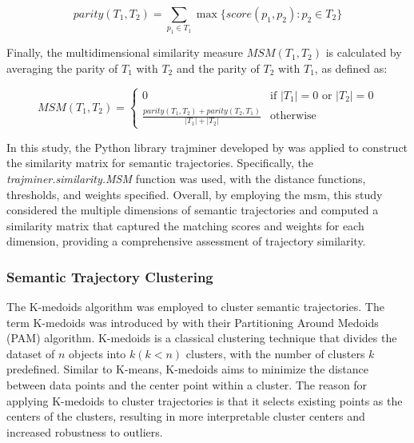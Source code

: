 \documentclass{article}
\theoremstyle{definition}
\theoremstyle{remark}
\begin{document}
\begin{equation} \label{eq:parity}
    parity(T_{1},T_{2}) = \sum_{p_{1}\in T_{1}}\max\{score(p_{1},p_{2}) : p_{2} \in T_{2}\}
\end{equation}

Finally, the multidimensional similarity measure $MSM(T_{1},T_{2})$ is calculated by averaging the parity of $T_{1}$ with $T_{2}$ and the parity of $T_{2}$ with $T_{1}$, as defined as:

\begin{equation} \label{eq:msm}
    MSM(T_{1},T_{2}) = \begin{cases}
    0 & \text{if } |T_{1}| = 0 \text{ or } |T_{2}| = 0 \\
    \frac{parity(T_{1},T_{2}) + parity(T_{2},T_{1})}{|T_{1}|+|T_{2}|} & \text{otherwise}
    \end{cases}
\end{equation}

In this study, the Python library trajminer developed by \cite{petry_trajminer_2019} was applied to construct the similarity matrix for semantic trajectories. Specifically, the \textit{trajminer.similarity.MSM} function was used, with the distance functions, thresholds, and weights specified. Overall, by employing the \acrshort{msm}, this study considered the multiple dimensions of semantic trajectories and computed a similarity matrix that captured the matching scores and weights for each dimension, providing a comprehensive assessment of trajectory similarity.


\subsubsection{Semantic Trajectory Clustering}
The K-medoids algorithm was employed to cluster semantic trajectories. The term K-medoids was introduced by \cite{kaufman_partitioning_1990} with their Partitioning Around Medoids (PAM) algorithm. K-medoids is a classical clustering technique that divides the dataset of $n$ objects into $k (k<n)$ clusters, with the number of clusters $k$ predefined. Similar to K-means, K-medoids aims to minimize the distance between data points and the center point within a cluster. The reason for applying K-medoids to cluster trajectories is that it selects existing points as the centers of the clusters, resulting in more interpretable cluster centers and increased robustness to outliers.
\end{document}
